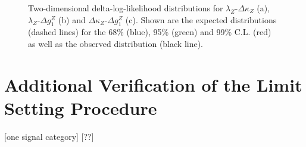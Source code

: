 \begin{figure}
	\centering
	\caption[Two-dimensional delta-log-likelihood distributions for the three combinations of aTGC parameters in the vertex parametrization]{Two-dimensional delta-log-likelihood distributions for $\lambda_Z$-$\Delta\kappa_Z$ (a), $\lambda_Z$-$\Delta g_1^Z$ (b) and $\Delta\kappa_Z$-$\Delta g_1^Z$ (c). Shown are the expected distributions (dashed lines) for the 68\% (blue), 95\% (green) and 99\% C.L. (red) as well as the observed distribution (black line).}
	\label{fig:limits:2dlimitsvertex}	
\end{figure}

\section{Additional Verification of the Limit Setting Procedure}
[one signal category]
[??]
